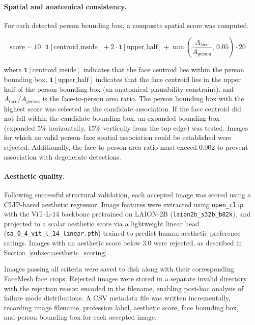 \paragraph{Spatial and anatomical consistency.} For each detected person
bounding box, a composite spatial score was computed:

\[
\text{score} = 10 \cdot \mathbf{1}[\text{centroid\_inside}] + 2 \cdot
\mathbf{1}[\text{upper\_half}] + \min\!\left(\frac{A_\text{face}}{A_\text{person}},\,
0.05\right) \cdot 20
\]

where $\mathbf{1}[\text{centroid\_inside}]$ indicates that the face
centroid lies within the person bounding box, $\mathbf{1}[\text{upper\_half}]$
indicates that the face centroid lies in the upper half of the person
bounding box (an anatomical plausibility constraint), and
$A_\text{face}/A_\text{person}$ is the face-to-person area ratio. The
person bounding box with the highest score was selected as the candidate
association. If the face centroid did not fall within the candidate bounding
box, an expanded bounding box (expanded 5\% horizontally, 15\% vertically
from the top edge) was tested. Images for which no valid person--face
spatial association could be established were rejected. Additionally, the
face-to-person area ratio must exceed $0.002$ to prevent association with
degenerate detections.

\paragraph{Aesthetic quality.} Following successful structural validation,
each accepted image was scored using a CLIP-based aesthetic regressor.
Image features were extracted using \texttt{open\_clip} with the ViT-L-14
backbone pretrained on LAION-2B (\texttt{laion2b\_s32b\_b82k}), and
projected to a scalar aesthetic score via a lightweight linear head
(\texttt{sa\_0\_4\_vit\_l\_14\_linear.pth}) trained to predict human
aesthetic preference ratings. Images with an aesthetic score below 3.0 were
rejected, as described in Section~\ref{subsec:aesthetic_scoring}.

Images passing all criteria were saved to disk along with their
corresponding FaceMesh face crops. Rejected images were stored in a
separate invalid directory with the rejection reason encoded in the
filename, enabling post-hoc analysis of failure mode distributions. A CSV
metadata file was written incrementally, recording image filename,
profession label, aesthetic score, face bounding box, and person bounding
box for each accepted image.

